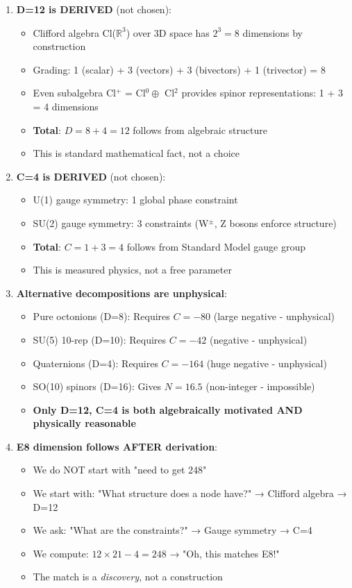 \documentclass[12pt,a4paper]{article}
\begin{document}
\begin{enumerate}
\item \textbf{D=12 is DERIVED} (not chosen):
\begin{itemize}
\item Clifford algebra Cl($\mathbb{R}^3$) over 3D space has $2^3 = 8$ dimensions by construction
\item Grading: 1 (scalar) + 3 (vectors) + 3 (bivectors) + 1 (trivector) = 8
\item Even subalgebra Cl$^+$ = Cl$^0 \oplus$ Cl$^2$ provides spinor representations: 1 + 3 = 4 dimensions
\item \textbf{Total}: $D = 8 + 4 = 12$ follows from algebraic structure
\item This is standard mathematical fact, not a choice
\end{itemize}

\item \textbf{C=4 is DERIVED} (not chosen):
\begin{itemize}
\item U(1) gauge symmetry: 1 global phase constraint
\item SU(2) gauge symmetry: 3 constraints (W$^\pm$, Z bosons enforce structure)
\item \textbf{Total}: $C = 1 + 3 = 4$ follows from Standard Model gauge group
\item This is measured physics, not a free parameter
\end{itemize}

\item \textbf{Alternative decompositions are unphysical}:
\begin{itemize}
\item Pure octonions (D=8): Requires $C = -80$ (large negative - unphysical)
\item SU(5) 10-rep (D=10): Requires $C = -42$ (negative - unphysical)
\item Quaternions (D=4): Requires $C = -164$ (huge negative - unphysical)
\item SO(10) spinors (D=16): Gives $N = 16.5$ (non-integer - impossible)
\item \textbf{Only D=12, C=4 is both algebraically motivated AND physically reasonable}
\end{itemize}

\item \textbf{E8 dimension follows AFTER derivation}:
\begin{itemize}
\item We do NOT start with "need to get 248"
\item We start with: "What structure does a node have?" → Clifford algebra → D=12
\item We ask: "What are the constraints?" → Gauge symmetry → C=4
\item We compute: $12 \times 21 - 4 = 248$ → "Oh, this matches E8!"
\item The match is a \textit{discovery}, not a construction
\end{itemize}
\end{enumerate}
\end{document}
